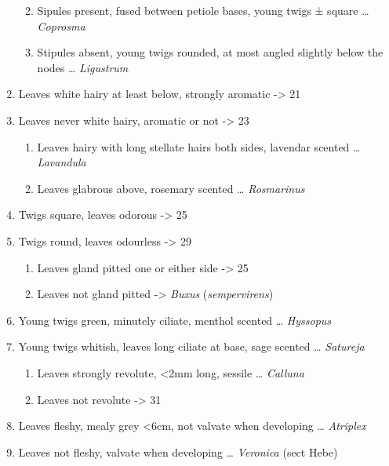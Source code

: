 \documentclass[openany]{book}
\providecommand{\tightlist}{%
  \setlength{\itemsep}{0pt}\setlength{\parskip}{0pt}}
\begin{document}
\begin{enumerate}
  \begin{enumerate}
  \def\labelenumii{\arabic{enumii}.}
  \setcounter{enumii}{16}
  \tightlist
  \item
    Sipules present, fused between petiole bases, young twigs ± square
    \ldots{} \emph{Coprosma}
  \item
    Stipules absent, young twigs rounded, at most angled slightly below
    the nodes \ldots{} \emph{Ligustrum}
  \end{enumerate}
\item
  Leaves white hairy at least below, strongly aromatic -\textgreater{}
  21
\item
  Leaves never white hairy, aromatic or not -\textgreater{} 23

  \begin{enumerate}
  \def\labelenumii{\arabic{enumii}.}
  \setcounter{enumii}{20}
  \tightlist
  \item
    Leaves hairy with long stellate hairs both sides, lavendar scented
    \ldots{} \emph{Lavandula}
  \item
    Leaves glabrous above, rosemary scented \ldots{} \emph{Rosmarinus}
  \end{enumerate}
\item
  Twigs square, leaves odorous -\textgreater{} 25
\item
  Twigs round, leaves odourless -\textgreater{} 29

  \begin{enumerate}
  \def\labelenumii{\arabic{enumii}.}
  \setcounter{enumii}{24}
  \tightlist
  \item
    Leaves gland pitted one or either side -\textgreater{} 25
  \item
    Leaves not gland pitted -\textgreater{} \emph{Buxus}
    (\emph{sempervirens})
  \end{enumerate}
\item
  Young twigs green, minutely ciliate, menthol scented \ldots{}
  \emph{Hyssopus}
\item
  Young twigs whitish, leaves long ciliate at base, sage scented
  \ldots{} \emph{Satureja}

  \begin{enumerate}
  \def\labelenumii{\arabic{enumii}.}
  \setcounter{enumii}{28}
  \tightlist
  \item
    Leaves strongly revolute, \textless{}2mm long, sessile \ldots{}
    \emph{Calluna}
  \item
    Leaves not revolute -\textgreater{} 31
  \end{enumerate}
\item
  Leaves fleshy, mealy grey \textless{}6cm, not valvate when developing
  \ldots{} \emph{Atriplex}
\item
  Leaves not fleshy, valvate when developing \ldots{} \emph{Veronica}
  (sect Hebe)
\end{enumerate}
\end{document}

